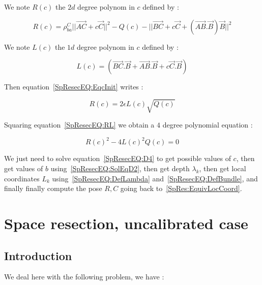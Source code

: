 We note $R(c)$ the $2d$ degree polynom in $c$ defined by :

\begin{equation}
   R(c) =   \rho^C_{ba}   ||\overrightarrow{AC}  + c \Vec{C}||^2
        - Q(c)
        - ||\overrightarrow{BC} + c \Vec{C} + (\overrightarrow{AB}. \Vec{B}) \Vec{B} ||^2
\end{equation}

We note $L(c)$ the $1d$ degree polynom in $c$ defined by :

\begin{equation}
	L(c)=   ( \overrightarrow{BC}.\Vec{B} + \overrightarrow{AB}. \Vec{B} +   c \Vec{C}.\Vec{B}  ) 
\end{equation}

Then equation~\ref{SpResecEQ:EqcInit} writes :

\begin{equation}
	R(c) = 2 \epsilon L(c)  \sqrt{Q(c) }   \label{SpResecEQ:RL}
\end{equation}

Squaring equation~\ref{SpResecEQ:RL} we obtain a $4$ degree polynomial equation :

\begin{equation}
	R(c) ^2 - 4 L(c)^2  Q(c) = 0   \label{SpResecEQ:D4}
\end{equation}

We just need to solve equation~\ref{SpResecEQ:D4} to get possible values of $c$, 
then get values of $b$ using~\ref{SpResecEQ:SolEqD2}, 
then get depth $\lambda _k$, then get local coordinates $L_k$ using~\ref{SpResecEQ:DefLambda} 
and~\ref{SpResecEQ:DefBundle}, and finally finally compute the pose $R,C$  going back to~\ref{SpRes:EquivLocCoord}.


\section{Space resection, uncalibrated case}


\subsection{Introduction}

We deal here with the following problem,  we have :

